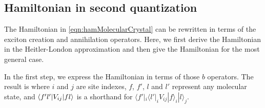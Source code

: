 \subsection{Hamiltonian in second quantization}

The Hamiltonian in \autoref{eqn:hamMolecularCrystal} can be rewritten in terms of the exciton creation and 
annihilation operators. Here, we first derive the Hamiltonian in the Heitler-London approximation and then give
the Hamiltonian for the most general case.

In the first step, we express the Hamiltonian in terms of those $b$ operators. The result is
where $i$ and $j$ are site indexes, $f$, $f'$, $l$ and $l'$ represent any molecular state, and $\langle f' l' | V_{ij} | f l \rangle$ is a shorthand for $\langle f' |_{i} \langle l' |_{i}  V_{ij} | f\rangle_{i}  | l\rangle_{j}$. 

